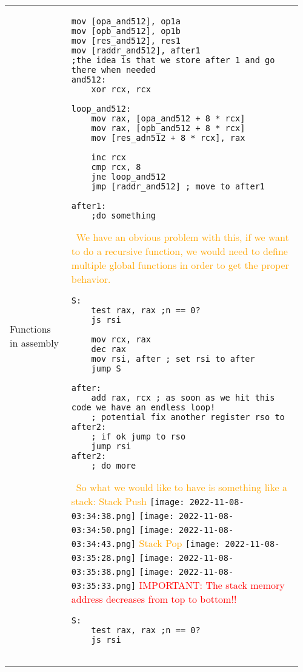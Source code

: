 \documentclass[main.tex,fontsize=8pt,paper=a4,paper=portrait,DIV=calc,]{scrartcl}
\begin{document}
\begin{table}[ht!]
\begin{tabular}{|m{0.2\linewidth}|m{0.755\linewidth}|}
\hline
Functions in assembly & 
\begin{lstlisting}
mov [opa_and512], op1a
mov [opb_and512], op1b
mov [res_and512], res1
mov [raddr_and512], after1
;the idea is that we store after 1 and go there when needed
and512:
    xor rcx, rcx

loop_and512:
    mov rax, [opa_and512 + 8 * rcx]
    mov rax, [opb_and512 + 8 * rcx]
    mov [res_adn512 + 8 * rcx], rax

    inc rcx
    cmp rcx, 8 
    jne loop_and512
    jmp [raddr_and512] ; move to after1

after1:
    ;do something
\end{lstlisting} 
\, \newline
\textcolor{orange}{We have an obvious problem with this, if we want to do a recursive function, we would need to define multiple global functions in order to get the proper behavior.}\newline
\begin{lstlisting}
S: 
    test rax, rax ;n == 0?
    js rsi

    mov rcx, rax
    dec rax
    mov rsi, after ; set rsi to after
    jump S 

after: 
    add rax, rcx ; as soon as we hit this code we have an endless loop!
    ; potential fix another register rso to after2:
    ; if ok jump to rso
    jump rsi
after2:
    ; do more
\end{lstlisting}
\, \newline
\textcolor{orange}{So what we would like to have is something like a stack:}\newline
\textcolor{orange}{Stack Push}\newline
\texttt{[image: 2022-11-08-03:34:38.png]}
\texttt{[image: 2022-11-08-03:34:50.png]}
\texttt{[image: 2022-11-08-03:34:43.png]}\newline
\textcolor{orange}{Stack Pop}\newline
\texttt{[image: 2022-11-08-03:35:28.png]}
\texttt{[image: 2022-11-08-03:35:38.png]}
\texttt{[image: 2022-11-08-03:35:33.png]}\newline
\textcolor{red}{IMPORTANT: The stack memory address decreases from top to bottom!!}\newline
\begin{lstlisting}
S: 
    test rax, rax ;n == 0?
    js rsi


\end{lstlisting}
\end{tabular}
\end{table}
\end{document}

